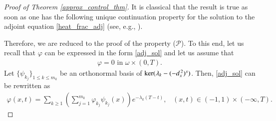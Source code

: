 \begin{proof}[Proof of Theorem \ref{approx_control_thm}]
It is classical that the result is true as soon as one has the following unique continuation property for the solution to the adjoint equation \eqref{heat_frac_adj} (see, e.g., \cite[Theorem 5.2]{micu2004introduction}).
	
	
Therefore, we are reduced to the proof of the property ($\mathcal P$). To this end, let us recall that $\varphi$ can be expressed in the form \eqref{adj_sol} and let us assume that 
\begin{align}\label{uc}
	\varphi=0 \textrm{ in } \omega\times(0,T). 
\end{align}
Let $\{\psi_{k_j}\}_{1\leq k\leq m_k}$ be an orthonormal basis of $\ker(\lambda_k-(-d_x^{\,2})^{s})$. Then, \eqref{adj_sol} can be rewritten as
\begin{align*}
	\varphi(x,t) = \sum_{k\geq 1} \left(\sum_{j=1}^{m_k} \varphi_{k_j}\psi_{k_j}(x)\right)e^{-\lambda_k(T-t)}, \;\;\; (x,t)\in (-1,1)\times(-\infty, T). 
\end{align*}


\end{proof}
